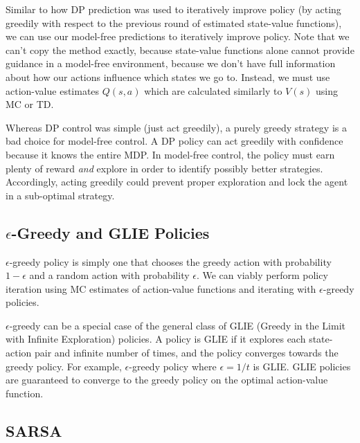\documentclass{article}
\newcommand{\ita}{\textit}
\newcommand{\eps}{\epsilon}
\begin{document}
Similar to how DP prediction was used to iteratively improve policy (by acting greedily with respect to the previous round of estimated state-value functions), we can use our model-free predictions to iteratively improve policy. Note that we can't copy the method exactly, because state-value functions alone cannot provide guidance in a model-free environment, because we don't have full information about how our actions influence which states we go to. Instead, we must use action-value estimates $Q(s, a)$ which are calculated similarly to $V(s)$ using MC or TD.

Whereas DP control was simple (just act greedily), a purely greedy strategy is a bad choice for model-free control. A DP policy can act greedily with confidence because it knows the entire MDP. In model-free control, the policy must earn plenty of reward \ita{and} explore in order to identify possibly better strategies. Accordingly, acting greedily could prevent proper exploration and lock the agent in a sub-optimal strategy.

\subsection{$\eps$-Greedy and GLIE Policies}

$\eps$-greedy policy is simply one that chooses the greedy action with probability $1-\eps$ and a random action with probability $\eps$. We can viably perform policy iteration using MC estimates of action-value functions and iterating with $\eps$-greedy policies.

$\eps$-greedy can be a special case of the general class of GLIE (Greedy in the Limit with Infinite Exploration) policies. A policy is GLIE if it explores each state-action pair and infinite number of times, and the policy converges towards the greedy policy. For example, $\eps$-greedy policy where $\eps = 1/t$ is GLIE. GLIE policies are guaranteed to converge to the greedy policy on the optimal action-value function.

\subsection{SARSA}
\end{document}
